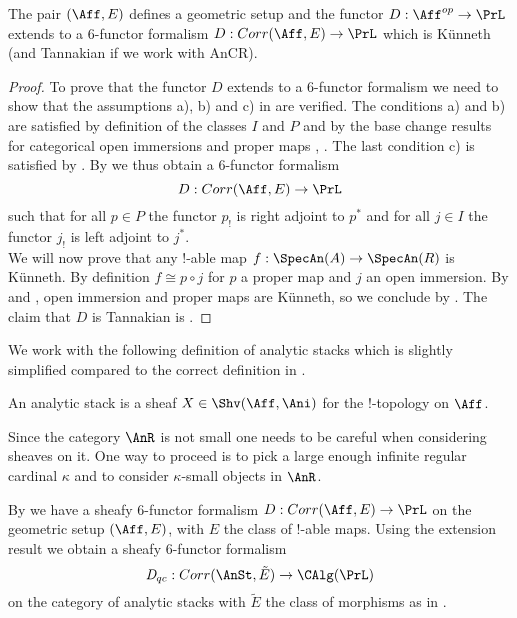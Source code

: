 \begin{proposition}\Cite[lecture 17]{AnSt}\label{affinekünneth}
The pair $(\Aff,E)$ defines a geometric setup and the functor $D: \Aff^{op} \to \PrL$ extends to a $6$-functor formalism  $D: Corr(\Aff,E) \to \PrL$ which is Künneth (and Tannakian if we work with $\text{AnCR}$).
\end{proposition}
\begin{proof}
 To prove that the functor $D$ extends to a $6$-functor formalism we need to show that the assumptions a), b) and c) in \Cite[Proposition 3.3.3]{heyer20246} are verified. The conditions a) and b) are satisfied by definition of the classes $I$ and $P$ and by the base change results for categorical open immersions and proper maps , . The last condition c) is satisfied by . By \Cite[Proposition 3.3.3]{heyer20246} we thus obtain a $6$-functor formalism 
 \[
 D: Corr(\Aff,E) \to \PrL
 \]
 such that for all $p\in P$ the functor $p_!$ is right adjoint to $p^*$ and for all $j\in I$ the functor $j_!$ is left adjoint to $j^*$. \\
 We will now prove that any $!$-able map $f : \SpecAn(A)\to \SpecAn(R)$ is Künneth. By definition $f\cong p \circ  j$ for $p$ a proper map and $j$ an open immersion. By  and , open immersion and proper maps are Künneth, so we conclude by . The claim that $D$ is Tannakian is \Cite[Lemma 2.1.3]{camargo2024analytic}.
\end{proof}

We work with the following definition of analytic stacks which is slightly simplified compared to the correct definition in \Cite[Lecture 19]{AnSt}.

\begin{definition}\Cite[Lecture 19]{AnSt}
 An analytic stack is a sheaf $X \in \Shv(\Aff, \Ani)$ for the $!$-topology on $\Aff$.
 
\end{definition}
\begin{remark}
Since the category $\AnR$ is not small one needs to be careful when considering sheaves on it. One way to proceed is to pick a large enough infinite regular cardinal $\kappa$ and to consider $\kappa$-small objects in $\AnR$. 
\end{remark}
By  we have a sheafy $6$-functor formalism $D : Corr(\Aff, E) \to \PrL$ on the geometric setup $(\Aff, E)$, with $E$ the class of $!$-able maps. Using the extension result \Cite[Theorem 3.4.11]{heyer20246} we obtain a sheafy $6$-functor formalism
\[
\mathit{D}_{qc} : Corr(\AnSt, \tilde{E}) \to \CAlg(\PrL)
\]
on the category of analytic stacks with $\tilde{E}$ the class of morphisms as in .

